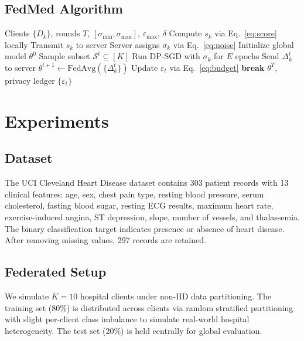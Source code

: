 \documentclass[journal]{IEEEtran}
\begin{document}
\subsection{FedMed Algorithm}
\begin{algorithm}
\caption{FedMed: Sensitivity-Aware Adaptive DP FL}
\label{alg:fedmed}
\begin{algorithmic}[1]
\REQUIRE Clients $\{D_k\}$, rounds $T$, $[\sigma_{\min},\sigma_{\max}]$,
         $\varepsilon_{\max}$, $\delta$
  \STATE Compute $s_k$ via Eq.~\ref{eq:score} locally
  \STATE Transmit $s_k$ to server
\ENDFOR
\STATE Server assigns $\sigma_k$ via Eq.~\ref{eq:noise}
\STATE Initialize global model $\theta^0$
  \STATE Sample subset $\mathcal{S}^t \subseteq [K]$
    \STATE Run DP-SGD with $\sigma_k$ for $E$ epochs
    \STATE Send $\Delta_k^t$ to server
  \ENDFOR
  \STATE $\theta^{t+1} \leftarrow \mathrm{FedAvg}(\{\Delta_k^t\})$
  \STATE Update $\varepsilon_t$ via Eq.~\ref{eq:budget}
    \STATE \textbf{break}
  \ENDIF
\ENDFOR
\RETURN $\theta^T$, privacy ledger $\{\varepsilon_t\}$
\end{algorithmic}
\end{algorithm}

\section{Experiments}
\label{sec:experiments}

\subsection{Dataset}
The UCI Cleveland Heart Disease dataset \cite{detrano1989} contains 303 patient
records with 13 clinical features: age, sex, chest pain type, resting blood
pressure, serum cholesterol, fasting blood sugar, resting ECG results, maximum
heart rate, exercise-induced angina, ST depression, slope, number of vessels,
and thalassemia. The binary classification target indicates presence or absence
of heart disease. After removing missing values, 297 records are retained.

\subsection{Federated Setup}
We simulate $K{=}10$ hospital clients under non-IID data partitioning. The
training set (80\%) is distributed across clients via random stratified
partitioning with slight per-client class imbalance to simulate real-world
hospital heterogeneity. The test set (20\%) is held centrally for global
evaluation.
\end{document}
